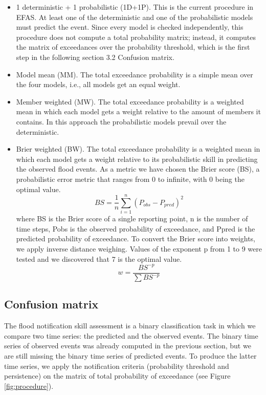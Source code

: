 \documentclass[preprint,12pt]{elsarticle}
\begin{document}
\begin{itemize}
    \item 1 deterministic + 1 probabilistic (1D+1P). This is the current procedure in EFAS. At least one of the deterministic and one of the probabilistic models must predict the event. Since every model is checked independently, this procedure does not compute a total probability matrix; instead, it computes the matrix of exceedances over the probability threshold, which is the first step in the following section 3.2 Confusion matrix.
    \item Model mean  (MM). The total exceedance probability is a simple mean over the four models, i.e., all models get an equal weight.
    \item Member weighted  (MW). The total exceedance probability is a weighted mean in which each model gets a weight relative to the amount of members it contains. In this approach the probabilistic models prevail over the deterministic.
    \item Brier weighted  (BW). The total exceedance probability is a weighted mean in which each model gets a weight relative to its probabilistic skill in predicting the observed flood events. As a metric we have chosen the Brier score (BS), a probabilistic error metric that ranges from 0 to infinite, with 0 being the optimal value. 
    \begin{equation}
        BS = \frac{1}{n}\sum_{i=1}^{n} \left( P_{obs} - P_{pred} \right)^2
    \end{equation}
    where BS  is the Brier score of a single reporting point, n  is the number of time steps, Pobs is the observed probability of exceedance, and Ppred  is the predicted probability of exceedance. 
    To convert the Brier score into weights, we apply inverse distance weighing. Values of the exponent p from 1 to 9 were tested and we discovered that 7 is the optimal value.
    \begin{equation}
        w = \frac{BS^{-p}}{\sum BS^{-p}}
    \end{equation}
\end{itemize}

\subsection{Confusion matrix}

The flood notification skill assessment is a binary classification task in which we compare two time series: the predicted and the observed events. The binary time series of observed events was already computed in the previous section, but we are still missing the binary time series of predicted events. To produce the latter time series, we apply the notification criteria (probability threshold and persistence) on the matrix of total probability of exceedance (see Figure \ref{fig:procedure}).
\end{document}
